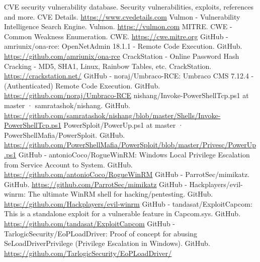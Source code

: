\documentclass[a4paper]{article}
\begin{document}
\begin{thebibliography}{0}
     CVE security vulnerability database. Security vulnerabilities, exploits, references and more. CVE Details. \href{https://www.cvedetails.com}{https://www.cvedetails.com}
     Vulmon - Vulnerability Intelligence Search Engine. Vulmon. \href{https://vulmon.com}{https://vulmon.com}
     MITRE. CWE - Common Weakness Enumeration. CWE. \href{https://cwe.mitre.org}{https://cwe.mitre.org}
     GitHub - amriunix/ona-rce: OpenNetAdmin 18.1.1 - Remote Code Execution. GitHub. \href{https://github.com/amriunix/ona-rce}{https://github.com/amriunix/ona-rce}
     CrackStation - Online Password Hash Cracking - MD5, SHA1, Linux, Rainbow Tables, etc. CrackStation. \href{https://crackstation.net/}{https://crackstation.net/}
     GitHub - noraj/Umbraco-RCE: Umbraco CMS 7.12.4 - (Authenticated) Remote Code Execution. GitHub. \href{https://github.com/noraj/Umbraco-RCE}{https://github.com/noraj/Umbraco-RCE}
     nishang/Invoke-PowerShellTcp.ps1 at master · samratashok/nishang. GitHub. \href{https://github.com/samratashok/nishang/blob/master/Shells/Invoke-PowerShellTcp.ps1}{https://github.com/samratashok/nishang/blob/master/Shells/Invoke-PowerShellTcp.ps1}
     PowerSploit/PowerUp.ps1 at master · PowerShellMafia/PowerSploit. GitHub. \href{https://github.com/PowerShellMafia/PowerSploit/blob/master/Privesc/PowerUp.ps1}{https://github.com/PowerShellMafia/PowerSploit/blob/master/Privesc/PowerUp.ps1}
     GitHub - antonioCoco/RogueWinRM: Windows Local Privilege Escalation from Service Account to System. GitHub. \href{https://github.com/antonioCoco/RogueWinRM}{https://github.com/antonioCoco/RogueWinRM}
     GitHub - ParrotSec/mimikatz. GitHub. \href{https://github.com/ParrotSec/mimikatz}{https://github.com/ParrotSec/mimikatz}
     GitHub - Hackplayers/evil-winrm: The ultimate WinRM shell for hacking/pentesting. GitHub. \href{https://github.com/Hackplayers/evil-winrm}{https://github.com/Hackplayers/evil-winrm}
     GitHub - tandasat/ExploitCapcom: This is a standalone exploit for a vulnerable feature in Capcom.sys. GitHub. \href{https://github.com/tandasat/ExploitCapcom}{https://github.com/tandasat/ExploitCapcom}
     GitHub - TarlogicSecurity/EoPLoadDriver: Proof of concept for abusing SeLoadDriverPrivilege (Privilege Escalation in Windows). GitHub. \href{https://github.com/TarlogicSecurity/EoPLoadDriver/}{https://github.com/TarlogicSecurity/EoPLoadDriver/}
\end{thebibliography}
\end{document}
